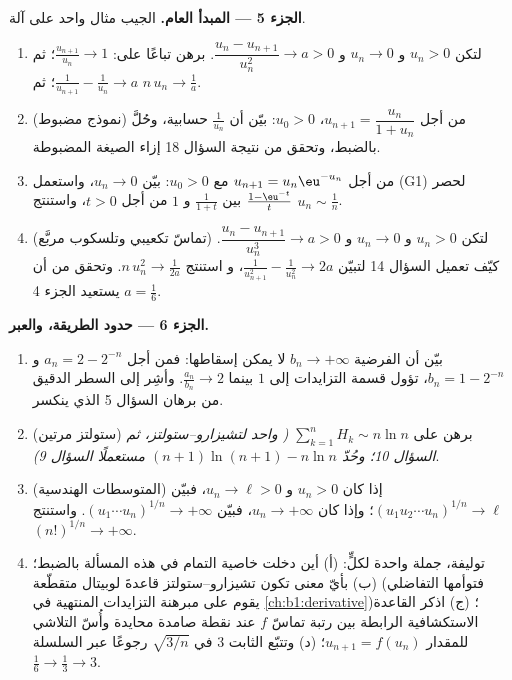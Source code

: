 \begin{problem}[{مسألة نهاية الأسبوع --- مبرهنة تشيزارو--ستولتز
والمقاربة $u_n \sim \sqrt{3/n}$ من أجل $u_{n+1} = \sin
u_n$}]
\medskip
\noindent\textbf{الجزء 5 --- المبدأ العام.} الجيب
مثال واحد على آلة.
\begin{enumerate}[resume]
  \item لتكن $u_n > 0$ و $u_n \to 0$ و $\dfrac{u_n -
        u_{n+1}}{u_n^{2}} \to a > 0$. برهن تباعًا على:
        $\frac{u_{n+1}}{u_n} \to 1$؛ ثم $\frac{1}{u_{n+1}} -
        \frac{1}{u_n} \to a$؛ ثم $n\,u_n \to \frac1a$.
  \item (نموذج مضبوط) من أجل $u_{n+1} = \dfrac{u_n}{1 + u_n}$، $u_0
        > 0$: بيّن أن $\frac{1}{u_n}$ حسابية، وحُلَّ بالضبط،
        وتحقق من نتيجة السؤال 18 إزاء الصيغة
        المضبوطة.
  \item من أجل $u_{n+1} = u_n \eu^{-u_n}$ مع $u_0 > 0$: بيّن $u_n \to
        0$، واستعمل (G1) لحصر $\frac{1 - \eu^{-t}}{t}$ بين
        $\frac{1}{1+t}$ و $1$ من أجل $t > 0$، واستنتج $u_n
        \sim \frac 1n$.
  \item (تماسّ تكعيبي وتلسكوب مربَّع) لتكن $u_n > 0$ و $u_n
        \to 0$ و $\dfrac{u_n - u_{n+1}}{u_n^{3}} \to a > 0$.
        كيّف تعميل السؤال 14 لتبيّن
        $\frac{1}{u_{n+1}^2} - \frac{1}{u_n^2} \to 2a$، و
        استنتج $n\,u_n^{2} \to \frac{1}{2a}$. وتحقق من أن $a =
        \frac16$ يستعيد الجزء 4.
\end{enumerate}

\medskip
\noindent\textbf{الجزء 6 --- حدود الطريقة، والعبر.}
\begin{enumerate}[resume]
  \item بيّن أن الفرضية $b_n \to +\infty$ لا يمكن
        إسقاطها: فمن أجل $a_n = 2 - 2^{-n}$ و $b_n = 1 - 2^{-n}$،
        تؤول قسمة التزايدات إلى $1$ بينما $\frac{a_n}
        {b_n} \to 2$. وأشِر إلى السطر الدقيق من برهان السؤال
        5 الذي ينكسر.
  \item (ستولتز مرتين) برهن على $\sum_{k=1}^{n} H_k \sim n \ln n$
        \emph{( واحد لتشيزارو--ستولتز، ثم السؤال
        10؛ وحُدّ $(n+1)\ln(n+1) - n\ln n$ مستعملًا السؤال 9)}.
  \item (المتوسطات الهندسية) إذا كان $u_n > 0$ و $u_n \to \ell > 0$،
        فبيّن $(u_1 u_2 \cdots u_n)^{1/n} \to \ell$؛ وإذا كان $u_n \to
        +\infty$، فبيّن $(u_1 \cdots u_n)^{1/n} \to +\infty$.
        واستنتج $(n!)^{1/n} \to +\infty$.
  \item توليفة، جملة واحدة لكلٍّ: (أ) أين دخلت خاصية
        التمام في هذه المسألة بالضبط؛ (ب) بأيّ معنى تكون
        تشيزارو--ستولتز قاعدةَ لوبيتال متقطّعة (فتوأمها
        التفاضلي يقوم على مبرهنة التزايدات المنتهية في
        \cref{ch:b1:derivative})؛ (ج) اذكر القاعدة الاستكشافية
        الرابطة بين رتبة تماسّ $f$ عند نقطة صامدة
        محايدة وأُسّ التلاشي للمقدار $u_{n+1} = f(u_n)$؛
        (د) وتتبّع الثابت $3$ في $\sqrt{3/n}$ رجوعًا عبر
        السلسلة $\frac16 \to \frac13 \to 3$.
\end{enumerate}
\end{problem}
